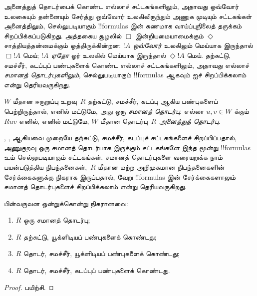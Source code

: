 \documentclass[../../../include/open-logic-section]{subfiles}
\begin{document}


அனைத்துத் தொடர்பைக் கொண்ட எல்லாச் சட்டகங்களிலும், அதாவது ஒவ்வோர் உலகையும்
தன்னையும் சேர்த்து ஒவ்வோர் உலகிலிருந்தும் அணுக முடியும் சட்டகங்கள் அனைத்திலும்,
செல்லுபடியாகும் !!{formula}s இன் கணமாக வாய்ப்புநிலைத் தருக்கம்~
சிறப்பிக்கப்படுகிறது. அத்தகைய சூழலில் $\Box$ இன்றியமையாமைக்கும் $\Diamond$
சாத்தியத்தன்மைக்கும் ஒத்திருக்கின்றன: $!A$ \emph{ஒவ்வோர்} உலகிலும் மெய்யாக
இருந்தால் $\Box !A$ மெய்; $!A$ \emph{ஏதோ} ஓர் உலகில் மெய்யாக இருந்தால்
$\Diamond !A$ மெய். தற்சுட்டு, சமச்சீர், கடப்புப் பண்புகளைக் கொண்ட எல்லாச்
சட்டகங்களிலும், அதாவது எல்லாச் \emph{சமானத் தொடர்புகளிலும்}, செல்லுபடியாகும்
!!{formula}s ஆகவும்  ஐச் சிறப்பிக்கலாம் என்று தெரியவருகிறது.

\begin{defn}
  $W$ மீதான ஈருறுப்பு உறவு~$R$ தற்சுட்டு, சமச்சீர், கடப்பு ஆகிய பண்புகளைப்
  பெற்றிருந்தால், எனில் மட்டுமே, அது ஒரு \emph{சமானத் தொடர்பு}. எல்லா
  $u,v \in W$ க்கும் $Ruv$ எனில், எனில் மட்டுமே, $W$ மீதான தொடர்பு~$R$
  \emph{அனைத்துத் தொடர்பு}.
\end{defn}

, ,  ஆகியவை முறையே தற்சுட்டு, சமச்சீர், கடப்புச்
சட்டகங்களைச் சிறப்பிப்பதால், அணுகுறவு ஒரு சமானத் தொடர்பாக இருக்கும்
சட்டகங்களே இந்த மூன்று !!{formula}s உம் செல்லுபடியாகும் சட்டகங்கள்.
சமானத் தொடர்புகளை வரையறுக்க நாம் பயன்படுத்திய நிபந்தனைகள்,~$R$ மீதான மற்ற
அறிமுகமான நிபந்தனைகளின் சேர்க்கைகளுக்கு நிகராக இருப்பதால், வேறு
!!{formula}s இன் சேர்க்கைகளாலும் சமானத் தொடர்புகளைச் சிறப்பிக்கலாம் என்று
தெரியவருகிறது.

\begin{prop}
  பின்வருவன ஒன்றுக்கொன்று நிகரானவை:
  \begin{enumerate}
  \item $R$ ஒரு சமானத் தொடர்பு;
  \item $R$ தற்சுட்டு, யூக்ளிடியப் பண்புகளைக் கொண்டது;
  \item $R$ தொடர், சமச்சீர், யூக்ளிடியப் பண்புகளைக் கொண்டது;
  \item $R$ தொடர், சமச்சீர், கடப்புப் பண்புகளைக் கொண்டது.
  \end{enumerate}
\end{prop}

\begin{proof}
  பயிற்சி.
\end{proof}
\end{document}
